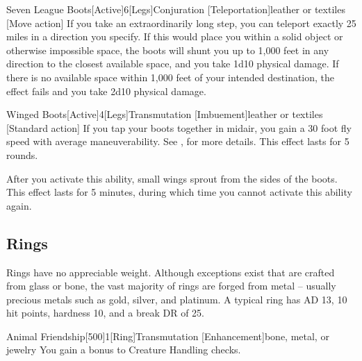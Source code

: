         \begin{magicitemdef}{Seven League Boots}[Active]{6}[Legs]{Conjuration [Teleportation]}{leather or textiles}
            [Move action] If you take an extraordinarily long step, you can teleport exactly 25 miles in a direction you specify.
            If this would place you within a solid object or otherwise impossible space, the boots will shunt you up to 1,000 feet in any direction to the closest available space, and you take 1d10 physical damage.
            If there is no available space within 1,000 feet of your intended destination, the effect fails and you take 2d10 physical damage.
        \end{magicitemdef}

        \begin{magicitemdef}{Winged Boots}[Active]{4}[Legs]{Transmutation [Imbuement]}{leather or textiles}
            [Standard action] If you tap your boots together in midair, you gain a 30 foot fly speed with average maneuverability.
            See , for more details.
            This effect lasts for 5 rounds.

            After you activate this ability, small wings sprout from the sides of the boots.
            This effect lasts for 5 minutes, during which time you cannot activate this ability again.
        \end{magicitemdef}

    \subsection{Rings}

         Rings have no appreciable weight.
        Although exceptions exist that are crafted from glass or bone, the vast majority of rings are forged from metal -- usually precious metals such as gold, silver, and platinum.
        A typical ring has AD 13, 10 hit points, hardness 10, and a break DR of 25.

        \begin{magicitemdef}{Animal Friendship}[500]{1}[Ring]{Transmutation [Enhancement]}{bone, metal, or jewelry}
             You gain a  bonus to Creature Handling checks.
        \end{magicitemdef}

